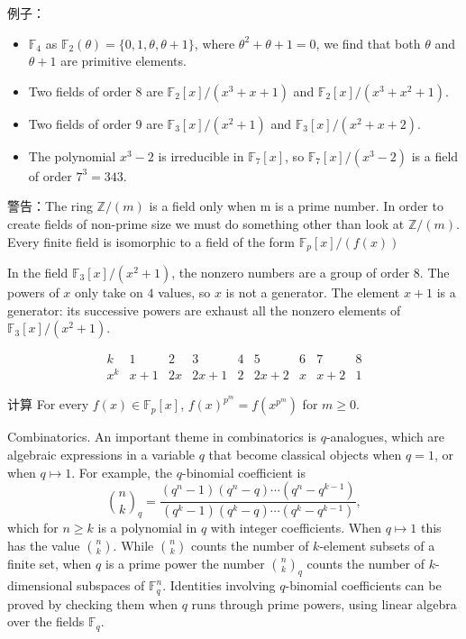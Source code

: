 例子：
\begin{itemize}
	\item $\mathbb{F}_4$ as $\mathbb{F}_2(\theta) = \{0, 1, \theta, \theta + 1\}$, where $\theta^2 + \theta + 1 = 0$, we find that both $\theta$ and $\theta + 1$ are primitive elements.
	\item  Two fields of order $8$ are $\mathbb{F}_2[x]/(x^3 + x + 1)$ and $\mathbb{F}_2[x]/(x^3 + x^2 + 1)$.
	\item Two fields of order $9$ are $\mathbb{F}_3[x]/(x^2 + 1)$ and $\mathbb{F}_3[x]/(x^2 + x + 2)$.
	\item The polynomial $x^3 - 2$ is irreducible in $\mathbb{F}_7[x]$, so $\mathbb{F}_7[x]/(x^3 - 2)$ is a field of order $7^3 = 343$.
\end{itemize}


警告：The ring $\mathbb{Z}/(m)$ is a field only when m is a prime number. In order to create fields of non-prime size we must do something other than look at $\mathbb{Z}/(m)$. Every finite field is isomorphic to a field of the form $\mathbb{F}_p[x]/(f(x))$



In the field $\mathbb{F}_3[x]/(x^2 +1)$, the nonzero numbers are a group of order $8$. The powers of $x$ only take on $4$ values, so $x$ is not a generator. The element $x + 1$ is a generator: its successive powers are exhaust all the nonzero elements
of $\mathbb{F}_3[x]/(x^2 +1)$.

\[
\begin{array}{c|cccccccc}
	k& 1&2&3&4&5&6&7&8 \\
	\hline
	x^k& x+1&2x&2x+1&2&2x+2&x&x+2&1
\end{array}
\]

 

计算 For every $f(x) \in \mathbb{F}_p[x]$, $f(x)^{p^m} = f(x^{p^m} )$ for $m \geq 0$.





Combinatorics. An important theme in combinatorics is $q$-analogues, which are algebraic expressions in a variable $q$ that become classical objects when $q = 1$, or when $q \mapsto 1$. For example, the $q$-binomial coefficient is
\[\binom{n}{k}_q = \frac{(q^n -1)(q^n -q)\cdots(q^n -q^{k-1})}{(q^k -1)(q^k -q)\cdots(q^k -q^{k-1})},\]
which for $n\geq k$ is a polynomial in $q$ with integer coefficients. When $q\mapsto 1$ this has
the value  $\binom{n}{k}$. While  $\binom{n}{k}$  counts the number of $k$-element subsets of a finite set, when $q$ is a prime power the number  $\binom{n}{k}_q$  counts the number of $k$-dimensional subspaces  of $\mathbb{F}_q^n$. Identities involving $q$-binomial coefficients can be proved by checking them when $q$ runs through prime powers, using linear algebra over the fields $\mathbb{F}_q$.




